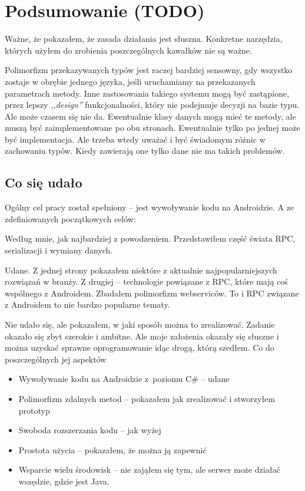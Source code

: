 \chapter{Podsumowanie (TODO)}
Ważne, że pokazałem, że zasada działania jest słuszna. Konkretne narzędzia, których użyłem do zrobienia poszczególnych kawałków nie są ważne.

Polimorfizm przekazywanych typów jest raczej bardziej sensowny, gdy wszystko zostaje w obrębie jednego języka, jeśli uruchamiamy na przekazanych parametrach metody. Inne zastosowania takiego systemu mogą być zastąpione, przez lepszy \emph{,,design''} funkcjonalności, który nie podejmuje decyzji na bazie typu. Ale może czasem się nie da. Ewentualnie klasy danych mogą mieć te metody, ale muszą być zaimplementowane po obu stronach. Ewentualnie tylko po jednej może być implementacja. Ale trzeba wtedy uważać i być świadomym różnic w zachowaniu typów. Kiedy zawierają one tylko dane nie ma takich problemów.

\section{Co się udało}
Ogólny cel pracy został spełniony -- jest wywoływanie kodu na Androidzie. A ze zdefiniowanych początkowych celów:
\begin{description}
Według mnie, jak najbardziej z powodzeniem. Przedstawiłem część świata RPC, serializacji i wymiany danych.

Udane. Z jednej strony pokazałem niektóre z aktualnie najpopularniejszych rozwiązań w branży. Z drugiej -- technologie powiązane z RPC, które mają coś wspólnego z Androidem. Zbadałem polimorfizm webserviców. To i RPC związane z Androidem to nie bardzo popularne tematy.

Nie udało się, ale pokazałem, w jaki sposób można to zrealizować. Zadanie okazało się zbyt szerokie i ambitne. Ale moje założenia okazały się słuszne i można uzyskać sprawne oprogramowanie idąc drogą, którą szedłem. Co do poszczególnych jej aspektów
\begin{itemize}
  \item Wywoływanie kodu na Androidzie z~poziomu C\# -- udane
	\item Polimorfizm zdalnych metod -- pokazałem jak zrealizować i stworzyłem prototyp
	\item Swoboda rozszerzania kodu -- jak wyżej
	\item Prostota użycia -- pokazałem, że można ją zapewnić
	\item Wsparcie wielu środowisk -- nie zająłem się tym, ale serwer może działać wszędzie, gdzie jest Java.
\end{itemize}

\end{description}

